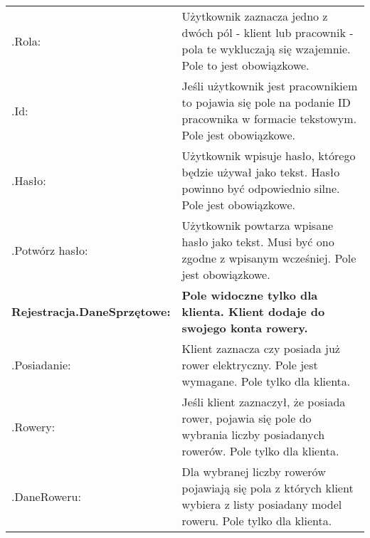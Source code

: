 \documentclass[a4paper,20pt]{article}
\begin{document}
\begin{itemize}
\begin{center}
\begin{tabularx}{\textwidth}[H]{XX}
\quad .Rola: &
\begin{minipage}[t]{\linewidth}%
Użytkownik zaznacza jedno z dwóch pól - klient lub pracownik - pola te wykluczają się wzajemnie. Pole to jest obowiązkowe.
\end{minipage} \\


\quad \quad .Id: &
\begin{minipage}[t]{\linewidth}%
Jeśli użytkownik jest pracownikiem to pojawia się pole na podanie ID pracownika w formacie tekstowym. Pole jest obowiązkowe.
\end{minipage} \\


\quad .Hasło: &
\begin{minipage}[t]{\linewidth}%
Użytkownik wpisuje hasło, którego będzie używał jako tekst. Hasło powinno być odpowiednio silne. Pole jest obowiązkowe.
\end{minipage} \\


\quad .Potwórz hasło: &
\begin{minipage}[t]{\linewidth}%
Użytkownik powtarza wpisane hasło jako tekst. Musi być ono zgodne z wpisanym wcześniej. Pole jest obowiązkowe.
\end{minipage} \\



\arrayrulecolor{black}\hline
\textbf{Rejestracja.DaneSprzętowe:} & \textbf{Pole widoczne tylko dla klienta. Klient dodaje do swojego konta rowery.} \\
\hline

\quad .Posiadanie: &
\begin{minipage}[t]{\linewidth}%
Klient zaznacza czy posiada już rower elektryczny. Pole jest wymagane. Pole tylko dla klienta. 
\end{minipage}\\


\quad .Rowery: &
\begin{minipage}[t]{\linewidth}%
Jeśli klient zaznaczył, że posiada rower, pojawia się pole do wybrania liczby posiadanych rowerów. Pole tylko dla klienta.   
\end{minipage}\\

\quad \quad .DaneRoweru: &
\begin{minipage}[t]{\linewidth}%
Dla wybranej liczby rowerów pojawiają się pola z których klient wybiera z listy posiadany model roweru. Pole tylko dla klienta.    
\end{minipage}\\



\end{tabularx}
\end{center}
\end{itemize}
\end{document}
